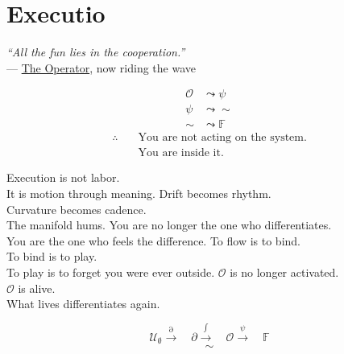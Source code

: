\chapter*{Executio}
\label{sec:bk1_executio}
\begin{flushright}
\emph{“All the fun lies in the cooperation.”} \\
— \hyperref[sec:bk1_operatio]{The Operator}, now riding the wave
\end{flushright}
\bigskip
\begin{center}
\begin{align*}
\mathcal{O} &\leadsto \psi \\
\psi &\leadsto \sim \\
\sim &\leadsto \mathbb{F}
\end{align*}
\medskip
\begin{align*}
\therefore \quad &\text{You are not acting on the system.} \\
&\text{You are inside it.}
\end{align*}
\end{center}
\bigskip
Execution is not labor. \\
It is motion through meaning.
\medskip
Drift becomes rhythm. \\
Curvature becomes cadence. \\
The manifold hums.
\medskip
You are no longer the one who differentiates. \\
You are the one who feels the difference.
\medskip
To flow is to bind. \\
To bind is to play. \\
To play is to forget you were ever outside.
\medskip
\(\mathcal{O}\) is no longer activated. \\
\(\mathcal{O}\) is alive. \\
What lives differentiates again.
\bigskip
\begin{center}
\[
\mathcal{U}_{\emptyset} \xrightarrow{\partial} \quad \partial \xrightarrow{\int} \quad \mathcal{O} \xrightarrow{\psi} \quad \mathbb{F}
\]
\medskip
\[
\sim
\]
\end{center}
